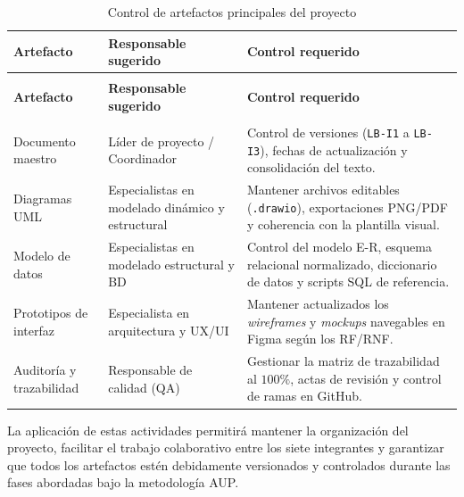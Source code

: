 {\small
\begin{xltabular}{\textwidth}{|>{\raggedright\arraybackslash}p{3.2cm}|>{\raggedright\arraybackslash}p{3.4cm}|X|}
    \caption{Control de artefactos principales del proyecto}
    \label{tab:control_artefactos} \\
    \hline
    \textbf{Artefacto} & \textbf{Responsable sugerido} & \textbf{Control requerido} \\
    \hline
    \endfirsthead

     \\
    \hline
    \textbf{Artefacto} & \textbf{Responsable sugerido} & \textbf{Control requerido} \\
    \hline
    \endhead

     \\
    \endfoot

    \endlastfoot

    Documento maestro & Líder de proyecto / Coordinador & Control de versiones (\texttt{LB-I1} a \texttt{LB-I3}), fechas de actualización y consolidación del texto. \\*
    \hline
    Diagramas UML & Especialistas en modelado dinámico y estructural & Mantener archivos editables (\texttt{.drawio}), exportaciones PNG/PDF y coherencia con la plantilla visual. \\*
    \hline
    Modelo de datos & Especialistas en modelado estructural y BD & Control del modelo E-R, esquema relacional normalizado, diccionario de datos y scripts SQL de referencia. \\*
    \hline
    Prototipos de interfaz & Especialista en arquitectura y UX/UI & Mantener actualizados los \textit{wireframes} y \textit{mockups} navegables en Figma según los RF/RNF. \\*
    \hline
    Auditoría y trazabilidad & Responsable de calidad (QA) & Gestionar la matriz de trazabilidad al $100\%$, actas de revisión y control de ramas en GitHub. \\
    \hline
\end{xltabular}
}

La aplicación de estas actividades permitirá mantener la organización del proyecto, facilitar el trabajo colaborativo entre los siete integrantes y garantizar que todos los artefactos estén debidamente versionados y controlados durante las fases abordadas bajo la metodología AUP.